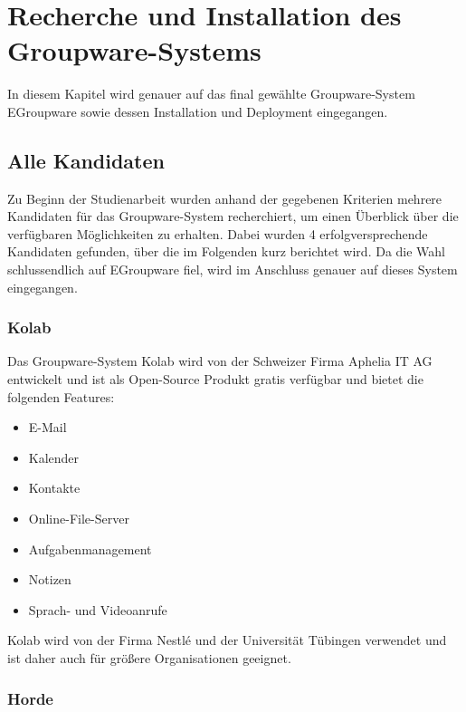 \chapter{Recherche und Installation des Groupware-Systems}

In diesem Kapitel wird genauer auf das final gewählte Groupware-System EGroupware sowie dessen Installation und Deployment eingegangen.

\section{Alle Kandidaten}

Zu Beginn der Studienarbeit wurden anhand der gegebenen Kriterien mehrere Kandidaten für das Groupware-System recherchiert, um einen Überblick über die verfügbaren Möglichkeiten zu erhalten.
Dabei wurden 4 erfolgversprechende Kandidaten gefunden, über die im Folgenden kurz berichtet wird.
Da die Wahl schlussendlich auf EGroupware fiel, wird im Anschluss genauer auf dieses System eingegangen.

\subsection{Kolab}

Das Groupware-System Kolab wird von der Schweizer Firma Aphelia IT AG entwickelt und ist als Open-Source Produkt gratis verfügbar und bietet die folgenden Features:
\begin{itemize}
    \item E-Mail
    \item Kalender
    \item Kontakte
    \item Online-File-Server
    \item Aufgabenmanagement
    \item Notizen
    \item Sprach- und Videoanrufe
\end{itemize}
\autocite{kolab}

Kolab wird von der Firma Nestlé und der Universität Tübingen verwendet und ist daher auch für größere Organisationen geeignet.

\subsection{Horde}

